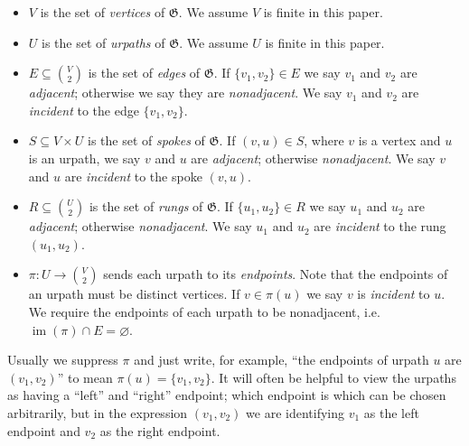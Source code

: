 \documentclass{article}
\newcommand{\Gf}{\mathfrak{G}}
\DeclareMathOperator{\im}{im}
\begin{document}
\begin{itemize}
    \item $V$ is the set of \textit{vertices} of $\Gf$. We assume $V$ is finite in this paper.
    \item $U$ is the set of \textit{urpaths} of $\Gf$. We assume $U$ is finite in this paper.
    \item $E\subseteq \binom{V}{2}$ is the set of \textit{edges} of $\Gf$. If $\{v_1,v_2\}\in E$ we say $v_1$ and $v_2$ are \textit{adjacent}; otherwise we say they are \textit{nonadjacent}. We say $v_1$ and $v_2$ are \textit{incident} to the edge $\{v_1,v_2\}$.
    \item $S\subseteq V\times U$ is the set of \textit{spokes} of $\Gf$. If $(v, u)\in S$, where $v$ is a vertex and $u$ is an urpath, we say $v$ and $u$ are \textit{adjacent}; otherwise \textit{nonadjacent}. We say $v$ and $u$ are \textit{incident} to the spoke $(v, u)$.
    \item $R\subseteq \binom{U}{2}$ is the set of \textit{rungs} of $\Gf$. If $\{u_1,u_2\}\in R$ we say $u_1$ and $u_2$ are \textit{adjacent}; otherwise \textit{nonadjacent}. We say $u_1$ and $u_2$ are \textit{incident} to the rung $(u_1, u_2)$.
    \item $\pi:U\to \binom{V}{2}$ sends each urpath to its \textit{endpoints}. Note that the endpoints of an urpath must be distinct vertices. If $v\in \pi(u)$ we say $v$ is \textit{incident} to $u$. We require the endpoints of each urpath to be nonadjacent, i.e.\ $\im(\pi)\cap E=\varnothing$.
\end{itemize}
Usually we suppress $\pi$ and just write, for example, ``the endpoints of urpath $u$ are $(v_1,v_2)$'' to mean $\pi(u)=\{v_1,v_2\}$. It will often be helpful to view the urpaths as having a ``left'' and ``right'' endpoint; which endpoint is which can be chosen arbitrarily, but in the expression $(v_1,v_2)$ we are identifying $v_1$ as the left endpoint and $v_2$ as the right endpoint. %
\end{document}
